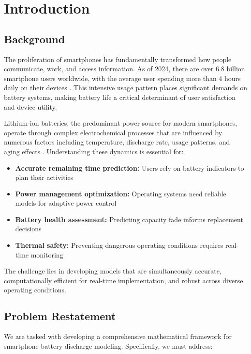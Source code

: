 \section{Introduction}

\subsection{Background}

The proliferation of smartphones has fundamentally transformed how people communicate, work, and access information. As of 2024, there are over 6.8 billion smartphone users worldwide, with the average user spending more than 4 hours daily on their devices \cite{statista2024}. This intensive usage pattern places significant demands on battery systems, making battery life a critical determinant of user satisfaction and device utility.

Lithium-ion batteries, the predominant power source for modern smartphones, operate through complex electrochemical processes that are influenced by numerous factors including temperature, discharge rate, usage patterns, and aging effects \cite{chen2021}. Understanding these dynamics is essential for:

\begin{itemize}
    \item \textbf{Accurate remaining time prediction:} Users rely on battery indicators to plan their activities
    \item \textbf{Power management optimization:} Operating systems need reliable models for adaptive power control
    \item \textbf{Battery health assessment:} Predicting capacity fade informs replacement decisions
    \item \textbf{Thermal safety:} Preventing dangerous operating conditions requires real-time monitoring
\end{itemize}

The challenge lies in developing models that are simultaneously accurate, computationally efficient for real-time implementation, and robust across diverse operating conditions.

\subsection{Problem Restatement}

We are tasked with developing a comprehensive mathematical framework for smartphone battery discharge modeling. Specifically, we must address:

